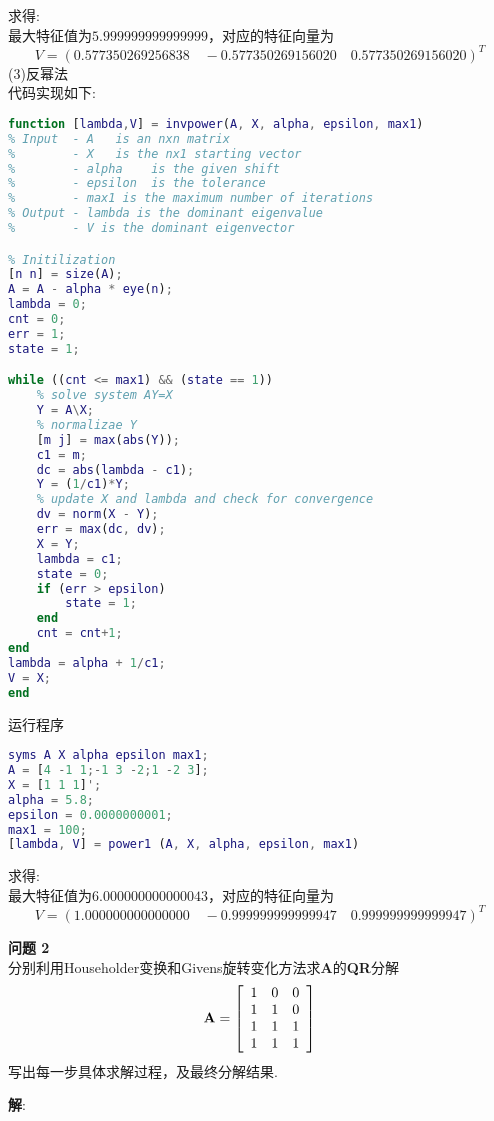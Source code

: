 \documentclass[UTF8]{ctexart}
\newenvironment{problem}[2][问题]
{\begin{mdframed}[backgroundcolor=gray!20] \textbf{#1 #2} \\}
	{\end{mdframed}}
\begin{document}
求得:\\
最大特征值为$5.999999999999999$，对应的特征向量为
$$V=(0.577350269256838 \quad -0.577350269156020 \quad 0.577350269156020)^{T}$$
(3)反幂法\\
代码实现如下:
\begin{lstlisting}[language=matlab]
function [lambda,V] = invpower(A, X, alpha, epsilon, max1)
% Input  - A   is an nxn matrix
%        - X   is the nx1 starting vector
%        - alpha    is the given shift
%        - epsilon  is the tolerance
%        - max1 is the maximum number of iterations
% Output - lambda is the dominant eigenvalue
%        - V is the dominant eigenvector

% Initilization
[n n] = size(A);
A = A - alpha * eye(n);
lambda = 0;
cnt = 0;
err = 1;
state = 1;

while ((cnt <= max1) && (state == 1))
	% solve system AY=X
	Y = A\X;
	% normalizae Y
	[m j] = max(abs(Y));
	c1 = m;
	dc = abs(lambda - c1);
	Y = (1/c1)*Y;
	% update X and lambda and check for convergence
	dv = norm(X - Y);
	err = max(dc, dv);
	X = Y;
	lambda = c1;
	state = 0;
	if (err > epsilon)
		state = 1;
	end
	cnt = cnt+1;
end
lambda = alpha + 1/c1;
V = X;
end
\end{lstlisting}
运行程序
\begin{lstlisting}[language=matlab]
syms A X alpha epsilon max1;
A = [4 -1 1;-1 3 -2;1 -2 3];
X = [1 1 1]';
alpha = 5.8;
epsilon = 0.0000000001;
max1 = 100;
[lambda, V] = power1 (A, X, alpha, epsilon, max1)
\end{lstlisting}
求得:\\
最大特征值为$6.000000000000043$，对应的特征向量为
$$V=(1.000000000000000 \quad -0.999999999999947 \quad 0.999999999999947)^{T}$$


\begin{problem}{2}
	分别利用Householder变换和Givens旋转变化方法求\textbf{A}的\textbf{QR}分解
	\begin{align}
		\mathbf{A}=\left[\begin{array}{ccc}
		1 & 0 & 0 \\
		1 & 1 & 0 \\
		1 & 1 & 1 \\
		1 & 1 & 1
		\end{array}\right]\notag
	\end{align}
	写出每一步具体求解过程，及最终分解结果.
\end{problem}
\textbf{解}:\\
\end{document}

